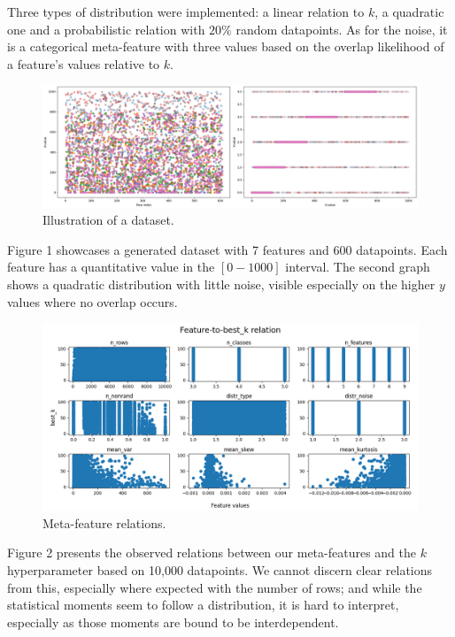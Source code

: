 \documentclass[a4paper,11pt]{article}
\begin{document}
Three types of distribution were implemented: a linear relation to \(k\), a quadratic one and a probabilistic relation with \(20\%\) random datapoints. As for the noise, it is a categorical meta-feature with three values based on the overlap likelihood of a feature's values relative to \(k\). 

\begin{figure}[ht]
\includegraphics[width=\textwidth]{Img/dataset.png}
\caption{Illustration of a dataset.}
\end{figure}

Figure 1 showcases a generated dataset with 7 features and 600 datapoints. Each feature has a quantitative value in the \([0-1000]\) interval. The second graph shows a quadratic distribution with little noise, visible especially on the higher \(y\) values where no overlap occurs.

\begin{figure}[ht]
\includegraphics[width=\textwidth]{Img/relations.png}
\caption{Meta-feature relations.}
\end{figure}

Figure 2 presents the observed relations between our meta-features and the \(k\) hyperparameter based on 10,000 datapoints. We cannot discern clear relations from this, especially where expected with the number of rows; and while the statistical moments seem to follow a distribution, it is hard to interpret, especially as those moments are bound to be interdependent. 
\end{document}
